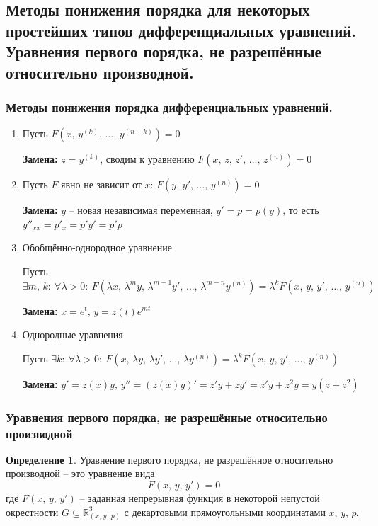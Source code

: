 \documentclass[a4paper,12pt]{article}
\theoremstyle{plain}
\theoremstyle{definition}
\newtheorem{definition}{Определение}[section]
\theoremstyle{remark}
\begin{document}
\subsection{Методы понижения порядка для некоторых простейших типов дифференциальных уравнений. Уравнения первого порядка, не разрешённые относительно производной.}
\subsubsection*{Методы понижения порядка дифференциальных уравнений.}
\begin{enumerate}
	\item Пусть $F(x,\, y^{(k)},\,\ldots,\,y^{(n + k)}) = 0$

	      \textbf{Замена:} $z = y^{(k)}$, сводим к уравнению $F(x,\, z,\, z',\,\ldots,\,z^{(n)}) = 0$
	\item Пусть $F$ явно не зависит от $x$: $F(y,\, y',\,\ldots,\,y^{(n)}) = 0$

	      \textbf{Замена:} $y$ -- новая независимая переменная, $y' = p = p(y)$, то есть $y''_{xx} = p'_x = p'y'=p'p$
	\item Обобщённо-однородное уравнение

	      Пусть $\exists m,\,k:\: \forall \lambda > 0:\: F(\lambda x,\, \lambda^m y,\, \lambda^{m - 1}y',\,\ldots,\,\lambda^{m - n}y^{(n)}) = \lambda^k F(x,\,y,\,y',\,\ldots,\,y^{(n)})$

	      \textbf{Замена:} $x = e^t,\, y = z(t)e^{mt}$
	\item Однородные уравнения

	      Пусть $\exists k:\: \forall \lambda > 0:\: F(x,\, \lambda y,\, \lambda y',\,\ldots,\, \lambda y^{(n)}) = \lambda^k F(x,\,y,\,y',\,\ldots,\,y^{(n)})$

	      \textbf{Замена:} $y' = z(x)y,\, y'' = (z(x)y)' = z'y + zy' = z'y + z^2y = y(z + z^2)$
\end{enumerate}

\subsubsection*{Уравнения первого порядка, не разрешённые относительно производной}
\begin{definition}
	Уравнение первого порядка, не разрешённое относительно производной -- это уравнение вида
	\[F(x,\,y,\,y') = 0\]
	где $F(x,\,y,\,y')$ -- заданная непрерывная функция в некоторой непустой окрестности $G \subseteq \mathbb{R}^3_{(x,\,y,\,p)}$ с декартовыми прямоугольными координатами $x,\,y,\,p$.
\end{definition}
\end{document}

